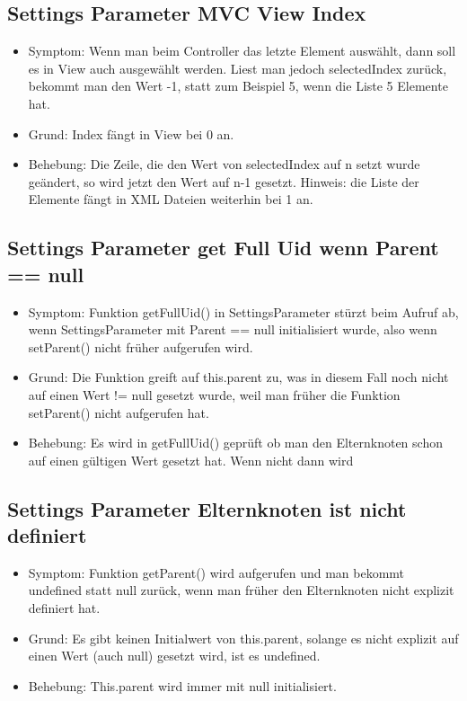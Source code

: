\documentclass[qualitaetssicherung.tex]{subfiles}
\begin{document}
	\subsection{Settings Parameter MVC View Index}
		\begin{itemize}
			\item
			Symptom: Wenn man beim Controller das letzte Element auswählt, dann soll es in View auch ausgewählt werden. Liest man jedoch selectedIndex zurück, bekommt man den Wert -1, statt zum Beispiel 5, wenn die Liste 5 Elemente hat. 
			\item
			Grund: Index fängt in View bei 0 an.
			\item
			Behebung: Die Zeile, die den Wert von selectedIndex auf n setzt wurde geändert, so wird jetzt den Wert auf n-1 gesetzt. Hinweis: die Liste der Elemente fängt in XML Dateien weiterhin bei 1 an.
		\end{itemize}
		
	\subsection{Settings Parameter get Full Uid wenn Parent == null}
		\begin{itemize}
			\item
			Symptom: Funktion getFullUid() in SettingsParameter stürzt beim Aufruf ab, wenn SettingsParameter mit Parent == null initialisiert wurde, also wenn setParent() nicht früher aufgerufen wird.
			\item
			Grund: Die Funktion greift auf this.parent zu, was in diesem Fall noch nicht auf einen Wert != null gesetzt wurde, weil man früher die Funktion setParent() nicht aufgerufen hat.
			\item
			Behebung: Es wird in getFullUid() geprüft ob man den Elternknoten schon auf einen gültigen Wert gesetzt hat. Wenn nicht dann wird 
		\end{itemize}
		
	\subsection{Settings Parameter Elternknoten ist nicht definiert}
		\begin{itemize}
			\item
			Symptom: Funktion getParent() wird aufgerufen und man bekommt undefined statt null zurück, wenn man früher den Elternknoten nicht explizit definiert hat.
			\item
			Grund: Es gibt keinen Initialwert von this.parent, solange es nicht explizit auf einen Wert (auch null) gesetzt wird, ist es undefined.
			\item
			Behebung: This.parent wird immer mit null initialisiert.
		\end{itemize}
		
\end{document}
